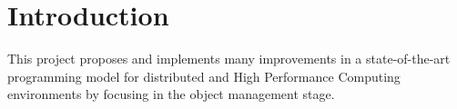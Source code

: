 \section{Introduction}
\label{sec:introduction}
This project proposes and implements many improvements in a state-of-the-art programming model for distributed and High Performance Computing environments by focusing in the object management stage.\\
\\